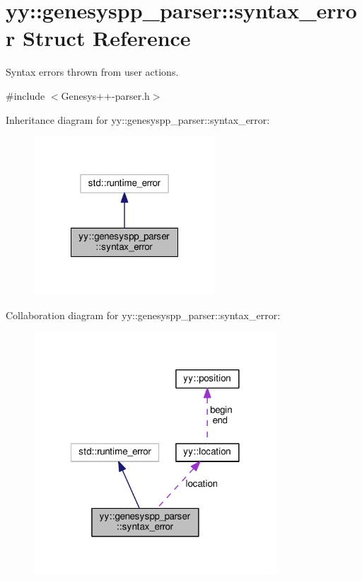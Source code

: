 \hypertarget{structyy_1_1genesyspp__parser_1_1syntax__error}{\section{yy\-:\-:genesyspp\-\_\-parser\-:\-:syntax\-\_\-error Struct Reference}
\label{structyy_1_1genesyspp__parser_1_1syntax__error}
}


Syntax errors thrown from user actions.  




{\ttfamily \#include $<$Genesys++-\/parser.\-h$>$}



Inheritance diagram for yy\-:\-:genesyspp\-\_\-parser\-:\-:syntax\-\_\-error\-:\nopagebreak
\begin{figure}[H]
\begin{center}
\leavevmode
\includegraphics[width=192pt]{structyy_1_1genesyspp__parser_1_1syntax__error__inherit__graph}
\end{center}
\end{figure}


Collaboration diagram for yy\-:\-:genesyspp\-\_\-parser\-:\-:syntax\-\_\-error\-:\nopagebreak
\begin{figure}[H]
\begin{center}
\leavevmode
\includegraphics[width=257pt]{structyy_1_1genesyspp__parser_1_1syntax__error__coll__graph}
\end{center}
\end{figure}
